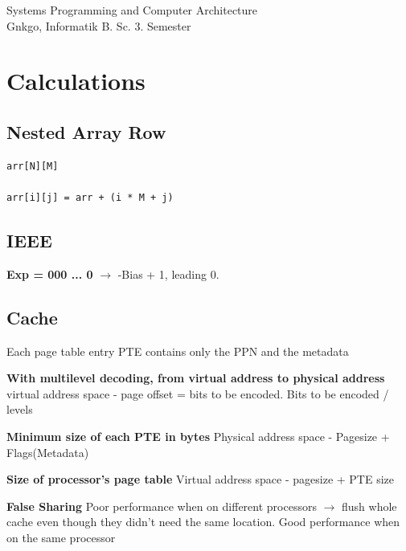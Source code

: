 \documentclass{article}
\begin{document}
\begin{titlepage}
    \thispagestyle{fancy}
    \renewcommand{\headrulewidth}{1pt}

    \center
    \vspace*{1.0cm}
    \Large Systems Programming and Computer Architecture \\[.5 cm]
    \large
    \normalsize
    Gnkgo, Informatik B. Sc. 3. Semester \\
    \vfill
\end{titlepage}

\tableofcontents
\newpage %



\section{Calculations}

\subsection{Nested Array Row}

\begin{verbatim}
arr[N][M]

arr[i][j] = arr + (i * M + j)
\end{verbatim}

\subsection{IEEE}

\textbf{Exp = 000 ... 0} $\rightarrow$ -Bias + 1, leading 0.

\subsection{Cache}

Each page table entry PTE contains only the PPN and the metadata

\textbf{With multilevel decoding, from virtual address to physical address} virtual address space - page offset = bits to be encoded. Bits to be encoded / levels

\textbf{Minimum size of each PTE in bytes} Physical address space - Pagesize + Flags(Metadata)

\textbf{Size of processor's page table} Virtual address space - pagesize + PTE size

\textbf{False Sharing} Poor performance when on different processors $\rightarrow$ flush whole cache even though they didn't need the same location. Good performance when on the same processor
\end{document}
